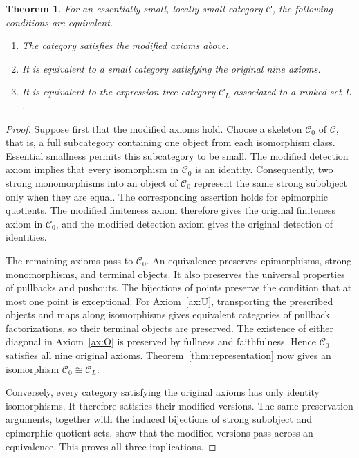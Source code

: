 \documentclass[11pt,a4paper]{article}
\theoremstyle{plain}
\newtheorem{theorem}{Theorem}[section]
\theoremstyle{definition}
\theoremstyle{remark}
\newcommand{\C}{\mathcal C}
\begin{document}
\begin{theorem}\label{concl:equivalence}
For an essentially small, locally small category $\C$, the
following conditions are equivalent.
\begin{enumerate}
\item The category satisfies the modified axioms above.
\item It is equivalent to a small category satisfying the
original nine axioms.
\item It is equivalent to the expression tree category
$\mathcal C_L$ associated to a ranked set $L$.
\end{enumerate}
\end{theorem}
\begin{proof}
Suppose first that the modified axioms hold. Choose a skeleton
$\C_0$ of $\C$, that is, a full subcategory containing one
object from each isomorphism class. Essential smallness permits
this subcategory to be small. The modified detection axiom
implies that every isomorphism in $\C_0$ is an identity.
Consequently, two strong monomorphisms into an object of
$\C_0$ represent the same strong subobject only when they
are equal. The corresponding assertion holds for epimorphic
quotients. The modified finiteness axiom therefore gives the
original finiteness axiom in $\C_0$, and the modified detection
axiom gives the original detection of identities.

The remaining axioms pass to $\C_0$. An equivalence preserves
epimorphisms, strong monomorphisms, and terminal objects.
It also preserves the universal properties of pullbacks and
pushouts. The bijections of points preserve the condition
that at most one point is exceptional. For
Axiom~\ref{ax:U}, transporting the prescribed objects and maps
along isomorphisms gives equivalent categories of pullback
factorizations, so their terminal objects are preserved.
The existence of either diagonal in Axiom~\ref{ax:O} is
preserved by fullness and faithfulness. Hence $\C_0$ satisfies
all nine original axioms. Theorem~\ref{thm:representation}
now gives an isomorphism $\C_0\cong\mathcal C_L$.

Conversely, every category satisfying the original axioms has
only identity isomorphisms. It therefore satisfies their
modified versions. The same preservation arguments, together
with the induced bijections of strong subobject and
epimorphic quotient sets, show that the modified versions
pass across an equivalence. This proves all three implications.
\end{proof}
\end{document}
